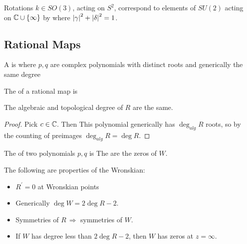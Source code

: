 \documentclass{article}
\begin{document}
\begin{fact}
Rotations $k \in SO(3)$, acting on $S^2$, correspond to elements of $SU(2)$ acting on $\mathbb{C} \cup \left\{ \infty \right\}$ by 
where $\left\lvert \gamma \right\rvert^2 + \left\lvert \delta \right\rvert^2 = 1$. 
\end{fact}

\subsection{Rational Maps}

\begin{definition}
A  is 
where $p,q$ are complex polynomials with distinct roots and generically the same degree
\end{definition}

\begin{definition}
The  of a rational map is 
\end{definition}

\begin{prop}
The algebraic and topological degree of $R$ are the same. 
\end{prop}
\begin{proof}
Pick $c \in \mathbb{C}$. Then 
This polynomial generically has $\deg_{alg} R$ roots, so by the counting of preimages $\deg_{alg} R = \deg R$. 
\end{proof}

\begin{definition}[Wronskian]
The  of two polynomials $p,q$ is 
The  are the zeros of $W$. 
\end{definition}

\begin{prop}
The following are properties of the Wronskian:
\begin{itemize}
    \item $R^\prime = 0$ at Wronskian points 
    \item Generically $\deg W = 2\deg R - 2$. 
    \item Symmetries of $R \, \Rightarrow$ symmetries of $W$. 
    \item If $W$ has degree less than $2\deg R - 2$, then $W$ has zeros at $z = \infty$. 
\end{itemize}
\end{prop}
\end{document}
